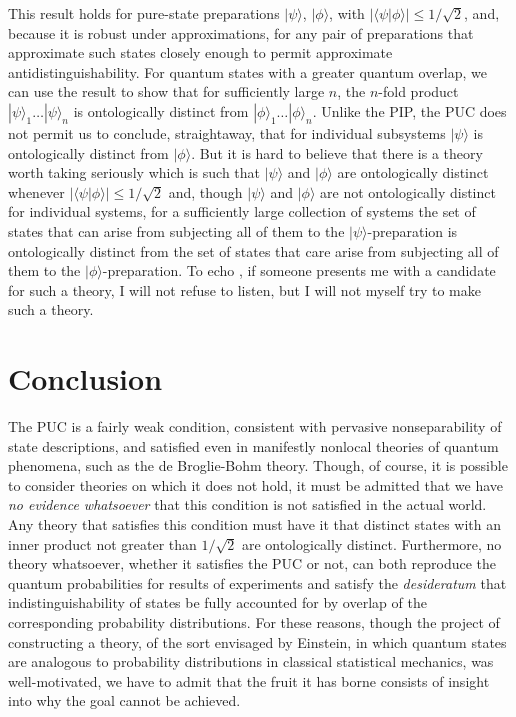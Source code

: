 \documentclass[12pt]{article}
\newcommand{\ket}[1]{|#1\rangle}
\newcommand{\bkt}[2]{\langle#1|#2\rangle}
\begin{document}
This result holds for pure-state preparations $\ket{\psi}$, $\ket{\phi}$, with $|\bkt{\psi}{\phi}| \leq 1 /\sqrt{2}$, and, because it is robust under approximations, for any pair of preparations that approximate such states closely enough to permit approximate antidistinguishability.  For quantum states with a greater quantum overlap, we can use the result to show that   for sufficiently large $n$, the $n$-fold product $\ket{\psi}_1 \ldots \ket{\psi}_n$ is ontologically distinct from $\ket{\phi}_1 \ldots \ket{\phi}_n$.   Unlike the PIP, the PUC does not permit us to conclude, straightaway, that for individual subsystems $\ket{\psi}$ is ontologically distinct from $\ket{\phi}$.  But it is hard to believe that there is a theory worth taking seriously which is such that  $\ket{\psi}$ and $\ket{\phi}$ are ontologically distinct whenever $|\bkt{\psi}{\phi}| \leq 1 /\sqrt{2}$ and, though    $\ket{\psi}$ and $\ket{\phi}$ are not ontologically distinct for individual systems, for a sufficiently large collection of systems the set of states that can arise from subjecting all of them  to the $\ket{\psi}$-preparation is ontologically distinct from the set of states that care arise from subjecting all of them to the $\ket{\phi}$-preparation.  To echo \citet{FVLC}, if someone presents me with a candidate for such a theory, I will not refuse to listen, but I will  not myself try to make such a theory.


\section{Conclusion} The PUC is a fairly weak condition,  consistent with pervasive nonseparability of state descriptions, and satisfied even in manifestly nonlocal theories of quantum phenomena, such as the de Broglie-Bohm theory.  Though, of course, it is  possible to consider theories on which it does not hold, it must be admitted that we have \emph{no evidence whatsoever} that this condition is not satisfied in the actual world.  Any theory that satisfies this condition must have it that distinct states with an inner product not greater than  $1 /\sqrt{2}$ are ontologically distinct. Furthermore, no theory whatsoever, whether it satisfies the PUC or not, can both reproduce the quantum probabilities for results of experiments and satisfy the \emph{desideratum} that indistinguishability of states  be fully accounted for by overlap of the corresponding probability distributions.  For these reasons, though the project of constructing a theory, of the sort envisaged by Einstein,  in which quantum states are analogous to  probability distributions in classical statistical mechanics, was well-motivated, we have to admit that the fruit it has borne consists of  insight into why the goal cannot be achieved.
\end{document}
